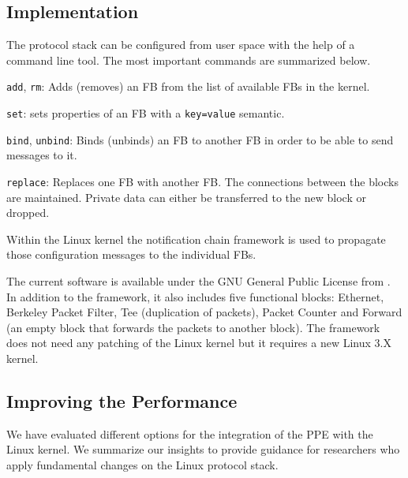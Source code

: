 \documentclass{sig-alternate}
\begin{document}
\subsection{Implementation}
The protocol stack can be configured from user space with the help of a 
command line tool. The most important commands are summarized below.
\begin{compactitem}
\item \texttt{add}, \texttt{rm}: Adds (removes) an FB from the 
      list of available FBs in the kernel. 
\item \texttt{set}: sets properties of an FB with a 
      \texttt{key=value} semantic.
\item \texttt{bind}, \texttt{unbind}: Binds (unbinds) an FB 
      to another FB in order to be able to send messages to it. 
\item \texttt{replace}: Replaces one FB with another 
      FB. The connections between the blocks are maintained. 
      Private data can either be transferred to the new block or dropped.
\end{compactitem}
Within the Linux kernel the notification chain framework is used to propagate those configuration messages to the individual FBs. 

The current software is available under the GNU General Public License from 
\cite{lana}. In addition to the framework, it also includes five functional 
blocks: Ethernet, Berkeley Packet Filter, Tee (duplication of packets), Packet 
Counter and Forward (an empty block that forwards the packets to 
another block). The framework does not need any patching of the Linux kernel
but it requires a new Linux 3.X kernel.

\subsection{Improving the Performance}
We have evaluated different options for the integration of the PPE with
the Linux kernel. We summarize our insights to provide guidance for researchers
who apply fundamental changes on the Linux protocol stack.
\end{document}
